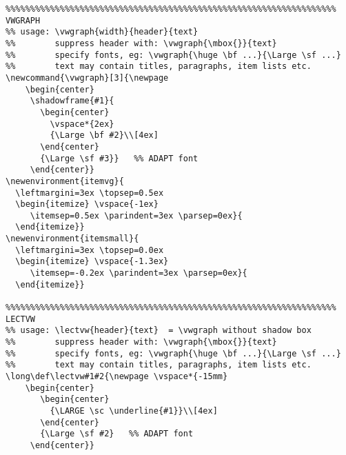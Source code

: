 {\begin{verbatim}
%%%%%%%%%%%%%%%%%%%%%%%%%%%%%%%%%%%%%%%%%%%%%%%%%%%%%%%%%%%%%%%%%%% VWGRAPH
%% usage: \vwgraph{width}{header}{text}  
%%        suppress header with: \vwgraph{\mbox{}}{text} 
%%        specify fonts, eg: \vwgraph{\huge \bf ...}{\Large \sf ...}
%%        text may contain titles, paragraphs, item lists etc.
\newcommand{\vwgraph}[3]{\newpage
    \begin{center}
     \shadowframe{#1}{
       \begin{center}
         \vspace*{2ex}
         {\Large \bf #2}\\[4ex]
       \end{center}
       {\Large \sf #3}}   %% ADAPT font
     \end{center}}
\newenvironment{itemvg}{
  \leftmargini=3ex \topsep=0.5ex
  \begin{itemize} \vspace{-1ex}
     \itemsep=0.5ex \parindent=3ex \parsep=0ex}{
  \end{itemize}}
\newenvironment{itemsmall}{
  \leftmargini=3ex \topsep=0.0ex
  \begin{itemize} \vspace{-1.3ex}
     \itemsep=-0.2ex \parindent=3ex \parsep=0ex}{
  \end{itemize}}

%%%%%%%%%%%%%%%%%%%%%%%%%%%%%%%%%%%%%%%%%%%%%%%%%%%%%%%%%%%%%%%%%%% LECTVW
%% usage: \lectvw{header}{text}  = \vwgraph without shadow box
%%        suppress header with: \vwgraph{\mbox{}}{text} 
%%        specify fonts, eg: \vwgraph{\huge \bf ...}{\Large \sf ...}
%%        text may contain titles, paragraphs, item lists etc.
\long\def\lectvw#1#2{\newpage \vspace*{-15mm}
    \begin{center}
       \begin{center}
         {\LARGE \sc \underline{#1}}\\[4ex]
       \end{center}
       {\Large \sf #2}   %% ADAPT font
     \end{center}}


\end{verbatim}}

